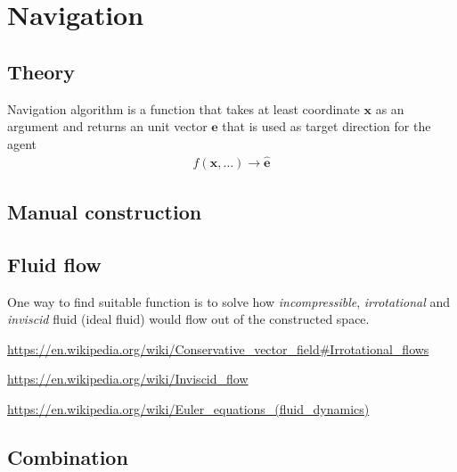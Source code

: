 \section{Navigation}
\subsection{Theory}
Navigation algorithm is a function that takes at least coordinate $ \mathbf{x} $ as an argument and returns an unit vector $ \hat{\mathbf{e}} $ that is used as target direction for the agent
\begin{align}
f(\mathbf{x}, \ldots) \to \hat{\mathbf{e}}
\end{align}


\subsection{Manual construction}


\subsection{Fluid flow}
One way to find suitable function is to solve how \emph{incompressible}, \emph{irrotational} and \emph{inviscid} fluid (ideal fluid) would flow out of the constructed space.

\url{https://en.wikipedia.org/wiki/Conservative_vector_field#Irrotational_flows}

\url{https://en.wikipedia.org/wiki/Inviscid_flow}

\url{https://en.wikipedia.org/wiki/Euler_equations_(fluid_dynamics)}

\subsection{Combination}


